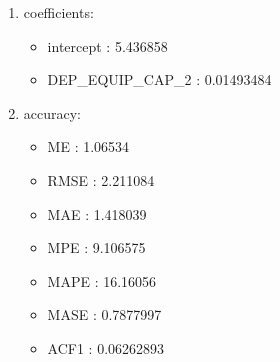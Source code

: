 \documentclass[10pt,a4paper]{article}\usepackage[]{graphicx}\usepackage[]{color}
\newcommand{\AaA}{\_}
\begin{document}
\begin{multicols}{2}
\begin{enumerate}
\item coefficients:
\begin{itemize}
\item  intercept :  5.436858 
\item  DEP\AaA EQUIP\AaA CAP\AaA 2 :  0.01493484 
\end{itemize}
\item accuracy:
\begin{itemize}
\item  ME :  1.06534 
\item  RMSE :  2.211084 
\item  MAE :  1.418039 
\item  MPE :  9.106575 
\item  MAPE :  16.16056 
\item  MASE :  0.7877997 
\item  ACF1 :  0.06262893 
\end{itemize}
\end{enumerate}
\end{multicols}
\end{document}
